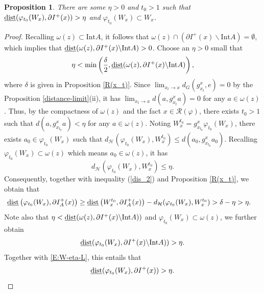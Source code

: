 \documentclass[a4paper,11pt]{article}
\theoremstyle{plain}
\newtheorem{prop}[thm]{Proposition}
\theoremstyle{definition}
\numberwithin{equation}{section}
\begin{document}
    


\begin{prop}\label{W_{x}}
    There are some $\eta>0$ and $t_0>1$ such that ${\rm \underline{dist}}(\varphi_{t_{0}}(W_{x}),\partial  I^{+}(x))>\eta$ and $\varphi_{t_{0}}(W_{x})\subset W_{x}$.
\end{prop}

\begin{proof}
    Recalling $\omega(z)\subset\text{Int}A$, it follows that $\omega(z)\cap (\partial  I^{+}(x)\backslash\text{Int}A)=\emptyset$, which implies that ${\rm \underline{dist}}(\omega(z),\partial  I^{+}(x)\backslash\text{Int}A)>0$. Choose an $\eta>0$ small that $$\eta<\min\left(\frac{\delta}{2}, {\rm \underline{dist}}(\omega(z),\partial  I^{+}(x)\backslash\text{Int}A)\right),$$
    where $\delta$ is given in Proposition \ref{R(x_t)}. Since $\lim_{x_t\rightarrow x}d_{G}(g^{x}_{x_t},e)=0$ by the Proposition \ref{distance-limit}(ii), it has $\lim_{x_t\rightarrow x}d(a,g^{x}_{x_t}a)=0$ for any $a\in \omega(z)$. Thus, by the compactness of $\omega(z)$ and the fact $x\in \mathcal{R}(\varphi)$, there exists $t_0>1$ such that $d(a,g^{x}_{x_{t_0}}a)<\eta$ for any $a\in \omega(z)$. Noting $W_{x}^{t_0}=g^{x}_{x_{t_0}}\varphi_{t_{0}}(W_{x})$, there exists $a_0\in \varphi_{t_{0}}(W_{x})$ such that $d_{\mathcal{H}}(\varphi_{t_{0}}(W_{x}),W_{x}^{t_0})\le d(a_0,g^{x}_{x_{t_0}}a_0)$. Recalling $\varphi_{t_{0}}(W_{x})\subset \omega(z)$ which means $a_0\in \omega(z)$, it has 
    \begin{equation}\label{le}
        d_{\mathcal{H}}(\varphi_{t_{0}}(W_{x}),W_{x}^{t_0})\le \eta.
    \end{equation}
    Consequently, together with inequality (\ref{dis_2}) and Proposition \ref{R(x_t)}, we obtain that
		\begin{align}
			{\rm \underline{dist}}\left(\varphi_{t_{0}}(W_{x}), \partial  I^{+}_{A}(x)\right)
			&\geq {\rm \underline{dist}}\left(W_{x}^{t_{0}}, \partial  I^{+}_{A}(x)\right)-d_{\mathcal{H}}(\varphi_{t_{0}}(W_{x}),W_{x}^{t_{0}})>\delta-\eta>\eta. \label{E:W-eta-L}
		\end{align}
		Note also that $\eta<{\rm \underline{dist}}(\omega(z),\partial  I^{+}(x)\backslash{\rm Int}A))$ and $\varphi_{t_{0}}(W_{x})\subset\omega(z)$, we further obtain $${\rm \underline{dist}}(\varphi_{t_{0}}(W_{x}),\partial  I^{+}(x)\backslash{\rm Int}A))>\eta.$$ Together with \eqref{E:W-eta-L}, this entails that
		\begin{equation}\label{E:W-boundary}
			{\rm \underline{dist}}(\varphi_{t_{0}}(W_{x}),\partial  I^{+}(x))>\eta.
		\end{equation}


\end{proof}
\end{document}
